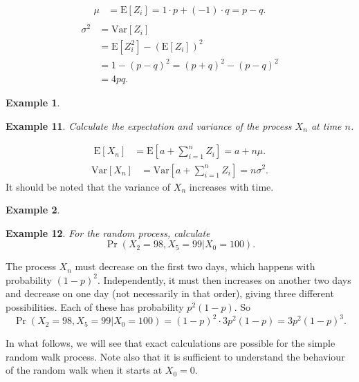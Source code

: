 \documentclass[
]{book}
\theoremstyle{definition}
\theoremstyle{definition}
\newtheorem{example}{Example}[chapter]
\theoremstyle{definition}
\theoremstyle{definition}
\theoremstyle{remark}
\begin{document}
\[\begin{aligned}
    \mu &= \mathrm{E}[Z_i] = 1\cdot p + (-1) \cdot q = p - q.\\\end{aligned}\]
\[\begin{aligned}
    \sigma^2 &= \mathrm{Var}[Z_i] \\
            &=\mathrm{E}[Z_i^2] - (\mathrm{E}[Z_i] )^2 \\
            &= 1 - (p-q)^2  = (p+q)^2 - (p-q)^2\\
            &= 4pq. \end{aligned}\]

\begin{example}
\protect\hypertarget{exm:unlabeled-div-11}{}\label{exm:unlabeled-div-11}

\textbf{Example 11}. \emph{Calculate the expectation and variance of the process
\(X_n\) at time \(n\).}

\end{example}

\[\begin{aligned}
     \mathrm{E}[X_n] &=  \mathrm{E}[a + \sum_{i=1}^n Z_i] = a + n\mu.\end{aligned}\]
\[\begin{aligned}
    \mathrm{Var}[X_n]&= \mathrm{Var}[a + \sum_{i=1}^n Z_i]  = n \sigma^2.\end{aligned}\]
It should be noted that the variance of \(X_n\) increases with time.

\begin{example}
\protect\hypertarget{exm:unlabeled-div-12}{}\label{exm:unlabeled-div-12}

\textbf{Example 12}. \emph{For the random process, calculate
\[\Pr(X_2 = 98, X_5 = 99 | X_0 = 100).\]}

\end{example}

The process \(X_n\) must decrease on the first two days, which happens
with probability \((1-p)^2\). Independently, it must then increases on
another two days and decrease on one day (not necessarily in that
order), giving three different possibilities. Each of these has
probability \(p^2(1-p)\). So
\[\Pr(X_2 = 98, X_5 = 99 | X_0 = 100) = (1-p)^2 \cdot 3 p^2(1-p) = 3p^2(1-p)^3.\]

In what follows, we will see that exact calculations are possible for
the simple random walk process. Note also that it is sufficient to
understand the behaviour of the random walk when it starts at \(X_0 = 0\).
\end{document}
